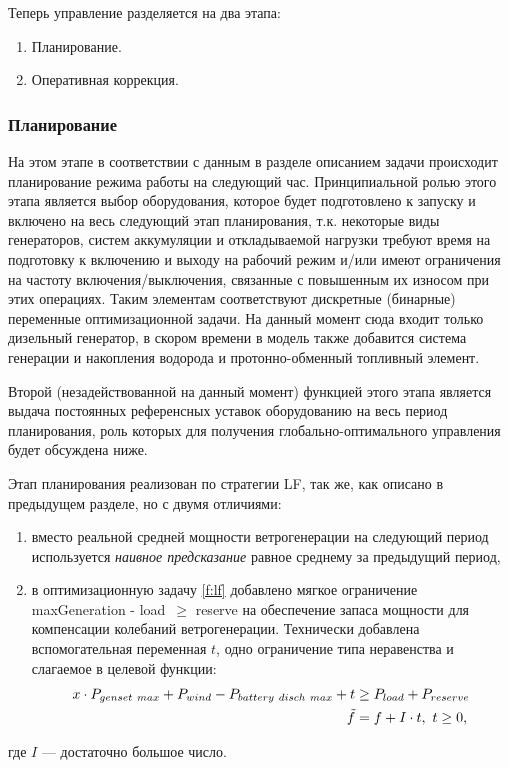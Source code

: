     Теперь управление разделяется на два этапа: 
    \begin{enumerate}
        \item  Планирование.
        \item Оперативная коррекция.
    \end{enumerate}
    
    \subsubsection{Планирование}
        На этом этапе в соответствии с данным в разделе \label{sec:planning_problem} описанием задачи происходит планирование режима работы на следующий час.
        Принципиальной ролью этого этапа является выбор оборудования, которое будет подготовлено к запуску и включено на весь следующий этап планирования, т.к. некоторые виды генераторов, систем аккумуляции и откладываемой нагрузки требуют время на подготовку к включению и выходу на рабочий режим и/или имеют ограничения на частоту включения/выключения, связанные с повышенным их износом при этих операциях.
        Таким элементам соответствуют дискретные (бинарные) переменные оптимизационной задачи.
        На данный момент сюда входит только дизельный генератор, в скором времени в модель также добавится система генерации и накопления водорода и протонно-обменный топливный элемент.
        
        Второй (незадействованной на данный момент) функцией этого этапа является выдача постоянных референсных уставок оборудованию на весь период планирования, роль которых для получения глобально-оптимального управления будет обсуждена ниже.
        
        Этап планирования реализован по стратегии LF, так же, как описано в предыдущем разделе, но с двумя отличиями: 
        \begin{enumerate}
            \item  вместо реальной средней мощности ветрогенерации на следующий период используется \textit{наивное предсказание} равное среднему за предыдущий период,
            
            \item  в оптимизационную задачу \ref{f:lf} добавлено мягкое ограничение 
            maxGeneration - load~$\geq$ reserve 
            на обеспечение запаса мощности для компенсации колебаний ветрогенерации.
            Технически добавлена вспомогательная переменная $t$, одно ограничение типа неравенства и слагаемое в целевой функции:
            \begin{equation}
                \begin{split}
                    x \cdot P_{genset~max} + P_{wind} - P_{battery~disch~max} + t &\geq P_{load} + P_{reserve}\\
                    \Tilde{f} &= f + I \cdot t, ~ t \geq 0,
                \end{split}
            \end{equation}
        \end{enumerate}
        где $I$ --- достаточно большое число.
        
